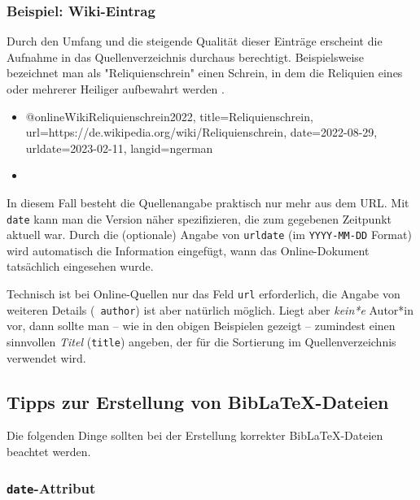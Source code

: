 \subsubsection{Beispiel: Wiki-Eintrag}
\label{sec:@online-www}

Durch den Umfang und die steigende Qualität dieser Einträge erscheint die
Aufnahme in das Quellenverzeichnis durchaus berechtigt. Beispielsweise
bezeichnet man als "Reliquienschrein" einen Schrein, in dem die Reliquien
eines oder mehrerer Heiliger aufbewahrt werden \cite{WikiReliquienschrein2022}.
%
\begin{itemize}
\item[]
\begin{GenericCode}[numbers=none]
@online{WikiReliquienschrein2022,
  title={Reliquienschrein},
  url={https://de.wikipedia.org/wiki/Reliquienschrein},
  date={2022-08-29},
  urldate={2023-02-11},
  langid={ngerman}
}
\end{GenericCode}
\item[\cite{WikiReliquienschrein2022}] 
\end{itemize}
%
In diesem Fall besteht die Quellenangabe praktisch nur mehr aus dem URL. Mit
\texttt{date} kann man die Version näher spezifizieren, die zum gegebenen
Zeitpunkt aktuell war. Durch die (optionale) Angabe von \texttt{urldate} (im
\texttt{YYYY-MM-DD} Format) wird automatisch die Information eingefügt, wann
das Online-Dokument tatsächlich eingesehen wurde.

Technisch ist bei Online-Quellen nur das Feld \texttt{url}
erforderlich, die Angabe von weiteren Details (\zB\ \texttt{author}) ist aber
natürlich möglich. Liegt aber \emph{kein*e} Autor*in vor, dann sollte man --
wie in den obigen Beispielen gezeigt -- zumindest einen sinnvollen
\emph{Titel} (\texttt{title}) angeben, der für die Sortierung im
Quellenverzeichnis verwendet wird.


\subsection{Tipps zur Erstellung von BibLaTeX-Dateien}
\label{sec:TippsZuBiblatex}

Die folgenden Dinge sollten bei der Erstellung korrekter BibLaTeX-Dateien
beachtet werden.

\subsubsection{\texttt{date}-Attribut}

